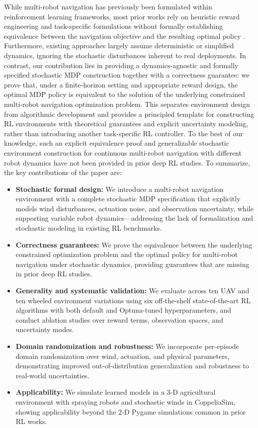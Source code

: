 \documentclass{article}
\begin{document}
While multi-robot navigation has previously been formulated within reinforcement learning frameworks, most prior works rely on heuristic reward engineering and task-specific formulations without formally establishing equivalence between the navigation objective and the resulting optimal policy \cite{chen2017icra, everett2018iros, long2017iral, fan2020ijrr, han2022iral}. Furthermore, existing approaches largely assume deterministic or simplified dynamics, ignoring the stochastic disturbances inherent to real deployments. In contrast, our contribution lies in providing a dynamics-agnostic and formally specified stochastic MDP construction together with a correctness guarantee: we prove that, under a finite-horizon setting and appropriate reward design, the optimal MDP policy is equivalent to the solution of the underlying constrained multi-robot navigation optimization problem. This separates environment design from algorithmic development and provides a principled template for constructing RL environments with theoretical guarantees and explicit uncertainty modeling, rather than introducing another task-specific RL controller. To the best of our knowledge, such an explicit equivalence proof and generalizable stochastic environment construction for continuous multi-robot navigation with different robot dynamics have not been provided in prior deep RL studies. To summarize, the key contributions of the paper are:
\begin{itemize}
    \item
\textbf{Stochastic formal design:} We introduce a multi-robot navigation environment with a complete stochastic MDP specification that explicitly models wind disturbances, actuation noise, and observation uncertainty, while supporting variable robot dynamics—addressing the lack of formalization and stochastic modeling in existing RL benchmarks.
\item
\textbf{Correctness guarantees:} We prove the equivalence between the underlying constrained optimization problem and the optimal policy for multi-robot navigation under stochastic dynamics, providing guarantees that are missing in prior deep RL studies.
\item
\textbf{Generality and systematic validation:} We evaluate across ten UAV and ten wheeled environment variations using six off-the-shelf state-of-the-art RL algorithms with both default and Optuna-tuned hyperparameters, and conduct ablation studies over reward terms, observation spaces, and uncertainty modes.
\item
\textbf{Domain randomization and robustness:} We incorporate per-episode domain randomization over wind, actuation, and physical parameters, demonstrating improved out-of-distribution generalization and robustness to real-world uncertainties.
\item
\textbf{Applicability:} We simulate learned models in a 3-D agricultural environment with spraying robots and stochastic winds in CoppeliaSim, showing applicability beyond the 2-D Pygame simulations common in prior RL works.
\end{itemize}
\end{document}
